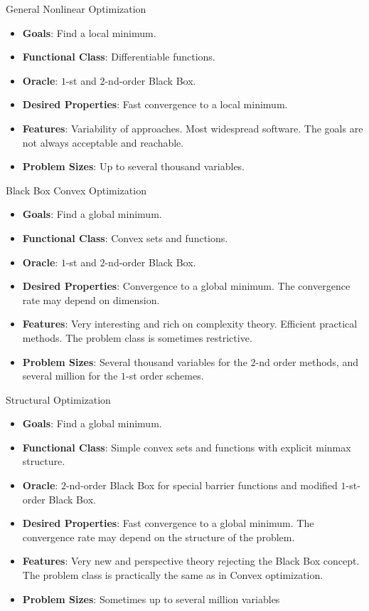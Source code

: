 \begin{boxnote}{General Nonlinear Optimization}
    \begin{itemize}
        \item \textbf{Goals}: Find a local minimum.
        \item \textbf{Functional Class}: Differentiable functions.
        \item \textbf{Oracle}: \(1\)-st and \(2\)-nd-order Black Box.
        \item \textbf{Desired Properties}: Fast convergence to a local minimum.
        \item \textbf{Features}: Variability of approaches. Most widespread software. The goals are not always acceptable and reachable.
        \item \textbf{Problem Sizes}: Up to several thousand variables.
    \end{itemize}
\end{boxnote}

\begin{boxnote}{Black Box Convex Optimization}
    \begin{itemize}
        \item \textbf{Goals}: Find a global minimum.
        \item \textbf{Functional Class}: Convex sets and functions.
        \item \textbf{Oracle}: \(1\)-st and \(2\)-nd-order Black Box.
        \item \textbf{Desired Properties}: Convergence to a global minimum. The convergence rate may depend on dimension.
        \item \textbf{Features}: Very interesting and rich on complexity theory. Efficient practical methods. The problem class is sometimes restrictive.
        \item \textbf{Problem Sizes}: Several thousand variables for the \(2\)-nd order methods, and several million for the \(1\)-st order schemes.
    \end{itemize}
\end{boxnote}

\begin{boxnote}{Structural Optimization}
    \begin{itemize}
        \item \textbf{Goals}: Find a global minimum.
        \item \textbf{Functional Class}: Simple convex sets and functions with explicit minmax structure.
        \item \textbf{Oracle}: \(2\)-nd-order Black Box for special barrier functions and modified \(1\)-st-order Black Box.
        \item \textbf{Desired Properties}: Fast convergence to a global minimum. The convergence rate may depend on the structure of the problem.
        \item \textbf{Features}: Very new and perspective theory rejecting the Black Box concept. The problem class is practically the same as in Convex optimization.
        \item \textbf{Problem Sizes}: Sometimes up to several million variables
    \end{itemize}
\end{boxnote}

